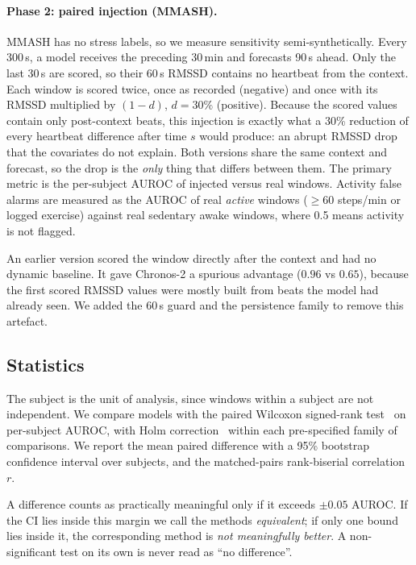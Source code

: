 \documentclass[11pt,a4paper]{article}
\begin{document}
\paragraph{Phase 2: paired injection (MMASH).} MMASH has no stress labels, so we measure sensitivity semi-synthetically. Every 300\,s, a model receives the preceding 30\,min and forecasts 90\,s ahead. Only the last 30\,s are scored, so their 60\,s RMSSD contains no heartbeat from the context. Each window is scored twice, once as recorded (negative) and once with its RMSSD multiplied by $(1-d)$, $d=30\%$ (positive). Because the scored values contain only post-context beats, this injection is exactly what a 30\% reduction of every heartbeat difference after time $s$ would produce: an abrupt RMSSD drop that the covariates do not explain. Both versions share the same context and forecast, so the drop is the \emph{only} thing that differs between them. The primary metric is the per-subject AUROC of injected versus real windows. Activity false alarms are measured as the AUROC of real \emph{active} windows ($\geq$60 steps/min or logged exercise) against real sedentary awake windows, where 0.5 means activity is not flagged.

An earlier version scored the window directly after the context and had no dynamic baseline. It gave Chronos-2 a spurious advantage ($0.96$ vs $0.65$), because the first scored RMSSD values were mostly built from beats the model had already seen. We added the 60\,s guard and the persistence family to remove this artefact.

\subsection{Statistics}
The subject is the unit of analysis, since windows within a subject are not independent. We compare models with the paired Wilcoxon signed-rank test~\cite{wilcoxon1945} on per-subject AUROC, with Holm correction~\cite{holm1979} within each pre-specified family of comparisons. We report the mean paired difference with a 95\% bootstrap confidence interval over subjects, and the matched-pairs rank-biserial correlation $r$.

A difference counts as practically meaningful only if it exceeds $\pm0.05$ AUROC. If the CI lies inside this margin we call the methods \emph{equivalent}; if only one bound lies inside it, the corresponding method is \emph{not meaningfully better}. A non-significant test on its own is never read as ``no difference''.
\end{document}
